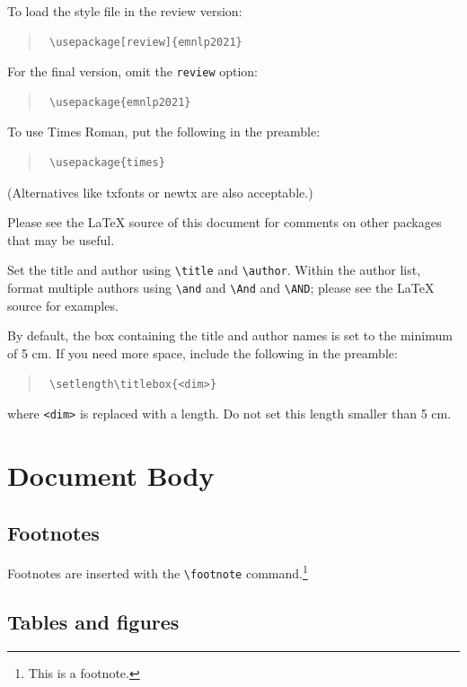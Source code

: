 \documentclass[11pt]{article}
\begin{document}
 To load the style file in the review version:
 \begin{quote}
 \begin{verbatim}
 \usepackage[review]{emnlp2021}
 \end{verbatim}
 \end{quote}
 For the final version, omit the \verb|review| option:
 \begin{quote}
 \begin{verbatim}
 \usepackage{emnlp2021}
 \end{verbatim}
 \end{quote}

 To use Times Roman, put the following in the preamble:
 \begin{quote}
 \begin{verbatim}
 \usepackage{times}
 \end{verbatim}
 \end{quote}
 (Alternatives like txfonts or newtx are also acceptable.)

 Please see the \LaTeX{} source of this document for comments on other packages that may be useful.

 Set the title and author using \verb|\title| and \verb|\author|. Within the author list, format multiple authors using \verb|\and| and \verb|\And| and \verb|\AND|; please see the \LaTeX{} source for examples.

 By default, the box containing the title and author names is set to the minimum of 5 cm. If you need more space, include the following in the preamble:
 \begin{quote}
 \begin{verbatim}
 \setlength\titlebox{<dim>}
 \end{verbatim}
 \end{quote}
 where \verb|<dim>| is replaced with a length. Do not set this length smaller than 5 cm.

 \section{Document Body}

 \subsection{Footnotes}

 Footnotes are inserted with the \verb|\footnote| command.\footnote{This is a footnote.}

 \subsection{Tables and figures}
\end{document}
